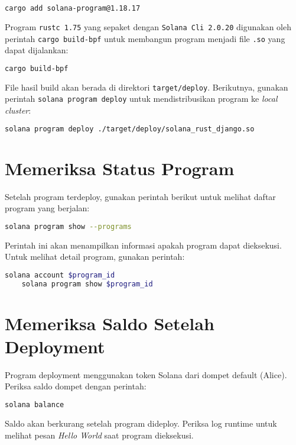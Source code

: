 \begin{lstlisting}[language=bash]
	cargo add solana-program@1.18.17
\end{lstlisting}

Program \texttt{rustc 1.75} yang sepaket dengan \texttt{Solana Cli 2.0.20} digunakan oleh perintah \texttt{cargo build-bpf} untuk membangun program menjadi file \texttt{.so} yang dapat dijalankan:

\begin{lstlisting}[language=bash]
	cargo build-bpf
\end{lstlisting}

File hasil build akan berada di direktori \texttt{target/deploy}. Berikutnya, gunakan perintah \texttt{solana program deploy} untuk mendistribusikan program ke \textit{local cluster}:

\begin{lstlisting}[language=bash]
	solana program deploy ./target/deploy/solana_rust_django.so
\end{lstlisting}

\section{Memeriksa Status Program}
Setelah program terdeploy, gunakan perintah berikut untuk melihat daftar program yang berjalan:

\begin{lstlisting}[language=bash]
	solana program show --programs
\end{lstlisting}

Perintah ini akan menampilkan informasi apakah program dapat dieksekusi. Untuk melihat detail program, gunakan perintah:

\begin{lstlisting}[language=bash]
	solana account $program_id
	solana program show $program_id
\end{lstlisting}

\section{Memeriksa Saldo Setelah Deployment}
Program deployment menggunakan token Solana dari dompet default (Alice). Periksa saldo dompet dengan perintah:

\begin{lstlisting}[language=bash]
	solana balance
\end{lstlisting}

Saldo akan berkurang setelah program dideploy. Periksa log runtime untuk melihat pesan \textit{Hello World} saat program dieksekusi.
